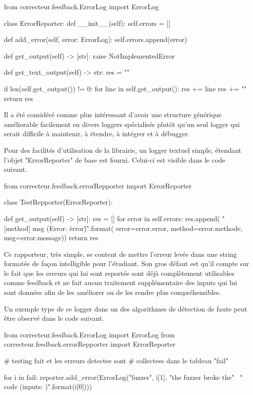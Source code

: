 \documentclass[a4paper]{report}
\begin{document}
\begin{python}
from correcteur.feedback.ErrorLog import ErrorLog

class ErrorReporter:
    def __init__(self):
        self.errors = []

    def add_error(self, error: ErrorLog):
        self.errors.append(error)

    def get_output(self) -> [str]:
        raise NotImplementedError

    def get_text_output(self) -> str:
        res = ""

        if len(self.get_output()) != 0:
            for line in self.get_output():
                res += line
                res += "\n"
        return res
\end{python}



Il a été considéré comme plus intéressant d'avoir une structure générique améliorable facilement en divers loggers spécialisés plutôt qu'un seul logger qui serait difficile à maintenir, à étendre, à intégrer et à débugger.


Pour des facilités d'utilisation de la librairie, un logger textuel simple, étendant l'objet "ErrorReporter" de base est fourni.
Celui-ci est visible dans le code suivant.


\begin{python}
from correcteur.feedback.errorRepporter import ErrorReporter


class TestRepporter(ErrorReporter):

    def get_output(self) -> [str]:
        res = []
        for error in self.errors:
            res.append(
                "[{method}] {msg} (Error: \"{error}\")".format(
                    error=error.error,
                    method=error.methode,
                    msg=error.message))
        return res
\end{python}

Ce rapporteur, très simple, se content de mettre l'erreur levée dans une string formatée de façon intelligible pour l'étudiant.
Son gros défaut est qu'il compte sur le fait que les erreurs qui lui sont reportée sont déjà complètement utilisables comme feedback et ne fait aucun traitement supplémentaire des inputs qui lui sont données afin de les améliorer ou de les rendre plus compréhensibles.


Un exemple type de ce logger dans un des algorithmes de détection de faute peut être observé dans le code suivant.

\begin{python}
from correcteur.feedback.ErrorLog import ErrorLog
from correcteur.feedback.errorRepporter import ErrorReporter

# testing fait et les erreurs detectee sont
# collectees dans le tableau "fail"

for i in fail:
	reporter.add_error(ErrorLog("fuzzer", i[1],
		"the fuzzer broke the" \
		" code  (inputs: {})".format(i[0])))
\end{python}
\end{document}

